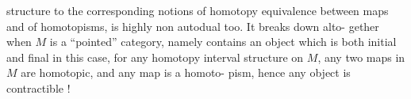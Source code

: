 structure to the corresponding notions of homotopy equivalence between
maps and of homotopisms,  is highly non autodual too.  It breaks down alto-%
gether when $M$ is a ``pointed'' category,  namely  contains an object which
is both initial and final \unsure{-}  in this case,   for any homotopy interval
structure on $M$,  any two maps in $M$ are homotopic,  and any map is a homoto-%
pism,  hence any object is contractible !

